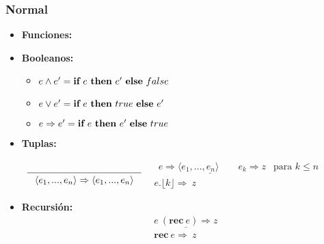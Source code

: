     \subsubsection{Normal}    
      \begin{itemize}
        \item \textbf{Funciones:}
          \begin{prooftree}
             
          \end{prooftree}
        \item \textbf{Booleanos:}
          \begin{itemize}
            \item $e \wedge e' = \IF{e}{e'}{false}$
            \item $e \vee e' = \IF{e}{true}{e'}$
            \item $e \Rightarrow e' = \IF{e}{e'}{true}$
          \end{itemize}
        \item \textbf{Tuplas:}
          \begin{multicols}{2}
            \vspace{3mm}
            $\begin{array}{c}
              \underline{\qquad \qquad \qquad \qquad \qquad \qquad}\\
              \la e_1, ..., e_n \ra \Rightarrow \la e_1, ..., e_n\ra
              \end{array}$
            $\begin{array}{c}
              \underline{\ \ e \Rightarrow \langle e_1,...,e_n\rangle\qquad e_k \Rightarrow z}  \ \ \text{ para } k \leq n \\
              e.\lfloor k\rfloor \Rightarrow\ z
              \end{array}$
          \end{multicols}
          \item \textbf{Recursión:}
            \[\begin{array}{c}
              \underline{ e\ (\textbf{rec}\ e) \Rightarrow z }\\
               \textbf{rec}\ e\Rightarrow \ z
              \end{array}\]
      \end{itemize}
        
